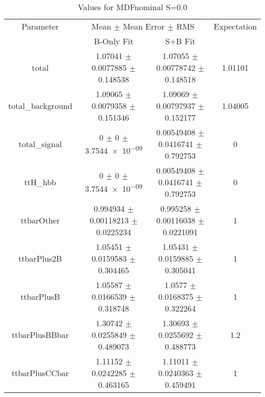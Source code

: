 \begin{table}
\centering
\caption{Values for MDFnominal S=0.0}
\begin{tabular}{cccc}
\toprule
Parameter & \multicolumn{2}{c}{Mean $\pm$ Mean Error $\pm$ RMS} & Expectation\\
 & B-Only Fit & S+B Fit & \\
\midrule
total & \num{1.07041} $\pm$ \num{0.0077885} $\pm$ \num{0.148538} & \num{1.07055} $\pm$ \num{0.00778742} $\pm$ \num{0.148518} & \num{1.01101}\\
total\_background & \num{1.09065} $\pm$ \num{0.0079358} $\pm$ \num{0.151346} & \num{1.09069} $\pm$ \num{0.00797937} $\pm$ \num{0.152177} & \num{1.04005}\\
total\_signal & \num{0} $\pm$ \num{0} $\pm$ \num{3.7544e-09} & \num{0.00549408} $\pm$ \num{0.0416741} $\pm$ \num{0.792753} & \num{0}\\
ttH\_hbb & \num{0} $\pm$ \num{0} $\pm$ \num{3.7544e-09} & \num{0.00549408} $\pm$ \num{0.0416741} $\pm$ \num{0.792753} & \num{0}\\
ttbarOther & \num{0.994934} $\pm$ \num{0.00118213} $\pm$ \num{0.0225234} & \num{0.995258} $\pm$ \num{0.00116038} $\pm$ \num{0.0221091} & \num{1}\\
ttbarPlus2B & \num{1.05451} $\pm$ \num{0.0159583} $\pm$ \num{0.304465} & \num{1.05431} $\pm$ \num{0.0159885} $\pm$ \num{0.305041} & \num{1}\\
ttbarPlusB & \num{1.05587} $\pm$ \num{0.0166539} $\pm$ \num{0.318748} & \num{1.0577} $\pm$ \num{0.0168375} $\pm$ \num{0.322264} & \num{1}\\
ttbarPlusBBbar & \num{1.30742} $\pm$ \num{0.0255849} $\pm$ \num{0.489073} & \num{1.30693} $\pm$ \num{0.0255692} $\pm$ \num{0.488773} & \num{1.2}\\
ttbarPlusCCbar & \num{1.11152} $\pm$ \num{0.0242285} $\pm$ \num{0.463165} & \num{1.11011} $\pm$ \num{0.0240363} $\pm$ \num{0.459491} & \num{1}\\
\bottomrule
\end{tabular}
\end{table}